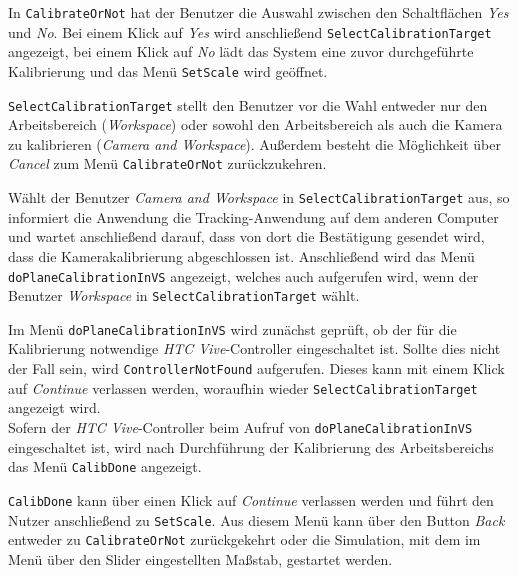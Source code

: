 In \texttt{CalibrateOrNot} hat der Benutzer die Auswahl zwischen den Schaltflächen \textit{Yes} und \textit{No}. Bei einem Klick auf \textit{Yes} wird anschließend \texttt{Select\-Calibration\-Target} angezeigt, bei einem Klick auf \textit{No} lädt das System eine zuvor durchgeführte Kalibrierung und das Menü \texttt{Set\-Scale} wird geöffnet.

\texttt{Select\-Calibration\-Target} stellt den Benutzer vor die Wahl entweder nur den Arbeitsbereich (\textit{Work\-space}) oder sowohl den Arbeitsbereich als auch die Kamera zu kalibrieren (\textit{Camera and Workspace}). Außerdem besteht die Möglichkeit über \textit{Cancel} zum Menü \texttt{Calibrate\-Or\-Not} zurückzukehren.

Wählt der Benutzer \textit{Camera and Workspace} in \texttt{Select\-Calibration\-Target} aus, so informiert die Anwendung die Tracking-Anwendung auf dem anderen Computer und wartet anschließend darauf, dass von dort die Bestätigung gesendet wird, dass die Kamerakalibrierung abgeschlossen ist. Anschließend wird das Menü \texttt{doPlane\-Calibration\-InVS} angezeigt, welches auch aufgerufen wird, wenn der Benutzer \textit{Work\-space} in \texttt{Select\-Calibration\-Target} wählt.

Im Menü \texttt{doPlane\-Calibration\-InVS} wird zunächst geprüft, ob der für die Kalibrierung notwendige \textit{HTC Vive}-Controller eingeschaltet ist. Sollte dies nicht der Fall sein, wird \texttt{Controller\-Not\-Found} aufgerufen. Dieses kann mit einem Klick auf \textit{Continue} verlassen werden, woraufhin wieder \texttt{Select\-Calibration\-Target} angezeigt wird.\\
Sofern der \textit{HTC Vive}-Controller beim Aufruf von \texttt{doPlane\-Calibration\-InVS} eingeschaltet ist, wird nach Durchführung der Kalibrierung des Arbeitsbereichs das Menü \texttt{CalibDone} angezeigt.

\texttt{Calib\-Done} kann über einen Klick auf \textit{Continue} verlassen werden und führt den Nutzer anschließend zu \texttt{SetScale}. Aus diesem Menü kann über den Button \textit{Back} entweder zu \texttt{CalibrateOrNot} zurückgekehrt oder die Simulation, mit dem im Menü über den Slider eingestellten Maßstab, gestartet werden.



